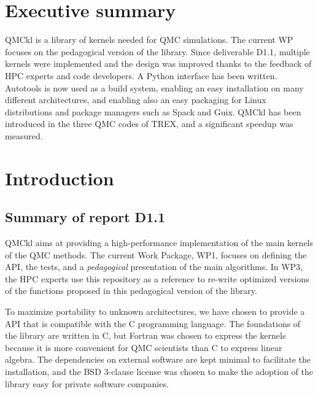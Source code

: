 \newcommand{\orgmode}{\texttt{org-mode}}
\newcommand{\Makefile}{\texttt{Makefile}}
\newcommand{\context}{\texttt{context}}
\newcommand{\CC}{C\nolinebreak\hspace{-.05em}\raisebox{.4ex}{\tiny\bf +}\nolinebreak\hspace{-.10em}\raisebox{.4ex}{\tiny\bf +}}
\def\CC{{C\nolinebreak[4]\hspace{-.05em}\raisebox{.4ex}{\tiny\bf ++}}}

\section{Executive summary}

QMCkl is a library of kernels needed for \ac{QMC} simulations. The current \ac{WP}
focuses on the pedagogical version of the library. Since deliverable D1.1, multiple kernels 
were implemented and the design was improved thanks to the feedback of HPC experts and code
developers. A Python interface has been written. Autotools is now used as a build system, 
enabling an easy installation on many different architectures, and enabling also an easy
packaging for Linux distributions and package managers such as Spack and Guix.
QMCkl has been introduced in the three \ac{QMC} codes of TREX, and a significant speedup
was measured.


\section{Introduction}

\subsection{Summary of report D1.1}

\Ac{QMCkl} aims at providing a high-performance
implementation of the main kernels of the \ac{QMC} methods. 
The current Work Package, WP1, focuses on defining the \ac{API}, the tests,
and a \emph{pedagogical} presentation of the main algorithms.
In WP3, the \ac{HPC} experts use this repository as a reference to re-write
optimized versions of the functions proposed in this pedagogical version of the library.

To maximize portability to unknown architectures, we have chosen to provide a \ac{API} that
is compatible with the C programming language. The foundations of the library are written in C, but Fortran
was chosen to express the kernels because it is more convenient for \ac{QMC} scientists than C to express linear algebra.
The dependencies on external software are kept minimal to facilitate the installation, and the
BSD 3-clause license was chosen to make the adoption of the library easy for private software companies. 

